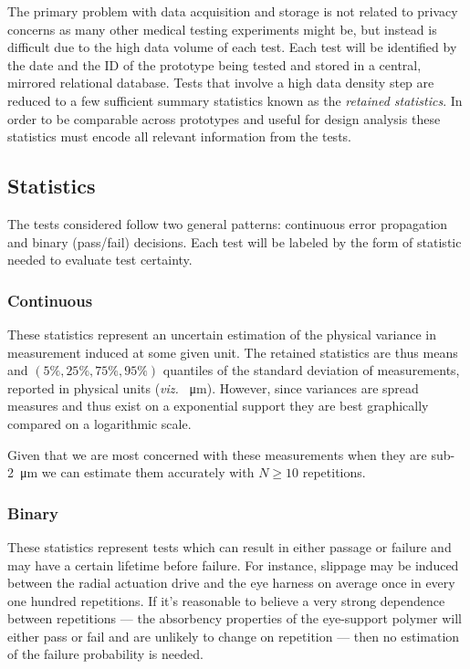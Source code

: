 \documentclass{article}
\begin{document}
The primary problem with data acquisition and storage is not related to privacy concerns as many other medical testing experiments might be, but instead is difficult due to the high data volume of each test. Each test will be identified by the date and the ID of the prototype being tested and stored in a central, mirrored relational database. Tests that involve a high data density step are reduced to a few sufficient summary statistics known as the \textit{retained statistics}. In order to be comparable across prototypes and useful for design analysis these statistics must encode all relevant information from the tests.

\subsection{Statistics}
\label{sec:statistics}

The tests considered follow two general patterns: continuous error
propagation and binary (pass/fail) decisions. Each test will be
labeled by the form of statistic needed to evaluate test certainty.

\subsubsection{Continuous}
\label{sec:continuous}

These statistics represent an uncertain estimation of the physical variance in measurement induced at some given unit. The retained statistics are thus means and $(5\%, 25\%, 75\%, 95\%)$ quantiles of the standard deviation of measurements, reported in physical units (\textit{viz.} \SI{}{\micro m}). However, since variances are spread measures and thus exist on a exponential support they are best graphically compared on a logarithmic scale.

Given that we are most concerned with these measurements when they are sub-\SI{2}{\micro m} we can estimate them accurately with $N \ge 10$ repetitions.

\subsubsection{Binary}
\label{sec:binary}

These statistics represent tests which can result in either passage or failure and may have a certain lifetime before failure. For instance, slippage may be induced between the radial actuation drive and the eye harness on average once in every one hundred repetitions. If it's reasonable to believe a very strong dependence between repetitions --- the absorbency properties of the eye-support polymer will either pass or fail and are unlikely to change on repetition --- then no estimation of the failure probability is needed.
\end{document}
